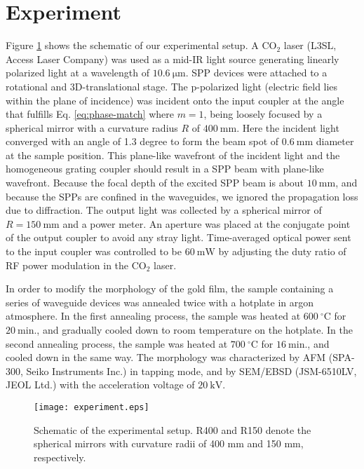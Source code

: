 \documentclass[aip,apl,reprint]{revtex4-1}
\begin{document}
\section{Experiment}
\label{sec:experiment}
Figure \ref{fig:experiment} shows the schematic of our experimental setup. 
A $\mathrm{CO_2}$ laser (L3SL, Access Laser Company) was used as a mid-IR light source generating linearly polarized light at a wavelength of $10.6\:\mathrm{\mu m}$. 
SPP devices were attached to a rotational and 3D-translational stage. 
The p-polarized light (electric field \color{red}lies within \color{black}the plane of incidence) was incident onto the input coupler at the angle that fulfills Eq. \ref{eq:phase-match} where $m=1$, being loosely focused by a spherical mirror with a curvature radius $R$ of $400\:\mathrm{mm}$.  Here the incident light converged with an angle of 1.3 degree to form the beam spot of $0.6\:\mathrm{mm}$ diameter at the sample position. This plane-like wavefront of the incident light and the homogeneous grating coupler should result in a SPP beam with plane-like wavefront. Because the focal depth of the excited SPP beam is about $10\:\mathrm{mm}$, and because the SPPs are confined in the waveguides, we ignored the propagation loss due to diffraction.
The output light was collected by a spherical mirror of $R=150\:\mathrm{mm}$ and a power meter. 
An aperture was placed at the conjugate point of the output coupler to avoid any stray light. 
Time-averaged optical power sent to the input coupler was controlled to be $60\:\mathrm{mW}$ by adjusting the duty ratio of RF power modulation in the $\mathrm{CO_2}$ laser.

In order to modify the morphology of the gold film, the sample containing a series of waveguide devices was annealed twice with a hotplate in argon atmosphere\cite{Nogues}.
In the first annealing process, the sample was heated at $600\:^\circ\mathrm{C}$ for $20\:\mathrm{min}$., and gradually cooled down to room temperature on the hotplate. In the second annealing process, the sample was heated at $700\:^\circ\mathrm{C}$ for $16\:\mathrm{min}$., and cooled down in the same way. The morphology was characterized by AFM (SPA-300, Seiko Instruments Inc.) in tapping mode, and \color{red}by \color{black}SEM/EBSD (JSM-6510LV, JEOL Ltd.) \color{red}with the acceleration voltage of $20\:\mathrm{kV}$.\color{black}

\begin{figure}
    \texttt{[image: experiment.eps]}
    \caption{Schematic of the experimental setup. \color{red}R400 and R150 denote the spherical mirrors with curvature radii of 400 mm and 150 mm, respectively.\color{black}}
     \label{fig:experiment}
\end{figure}
\end{document}
